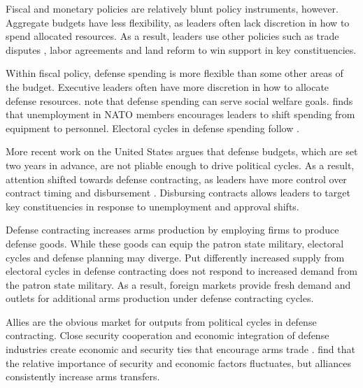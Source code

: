 \documentclass[12pt]{article}
\begin{document}
Fiscal and monetary policies are relatively blunt policy instruments, however. 
Aggregate budgets have less flexibility, as leaders often lack discretion in how to spend allocated resources. 
As a result, leaders use other policies such as trade disputes \citep{Conconietal2017}, labor agreements \citep{Ahlquist2010} and land reform \cite{Philips2020} to win support in key constituencies. 


Within fiscal policy, defense spending is more flexible than some other areas of the budget.
Executive leaders often have more discretion in how to allocate defense resources.
\citet{WhittenWilliams2011} note that defense spending can serve social welfare goals. 
\citet{Becker2021} finds that unemployment in NATO members encourages leaders to shift spending from equipment to personnel.
Electoral cycles in defense spending follow \citep{Tufte1978, Mintz1988}.


More recent work on the United States argues that defense budgets, which are set two years in advance, are not pliable enough to drive political cycles.
As a result, attention shifted towards defense contracting, as leaders have more control over contract timing and disbursement \citep{Mayer1995, DerouenHeo2000}.
Disbursing contracts allows leaders to target key constituencies in response to unemployment and approval shifts.


Defense contracting increases arms production by employing firms to produce defense goods. 
While these goods can equip the patron state military, electoral cycles and defense planning may diverge.
Put differently increased supply from electoral cycles in defense contracting does not respond to increased demand from the patron state military. 
As a result, foreign markets provide fresh demand and outlets for additional arms production under defense contracting cycles. 


Allies are the obvious market for outputs from political cycles in defense contracting.
Close security cooperation and economic integration of defense industries create economic and security ties that encourage arms trade \citep{Bitzinger1994}. 
\citet{Thurneretal2019} find that the relative importance of security and economic factors fluctuates, but alliances consistently increase arms transfers.
\end{document}
